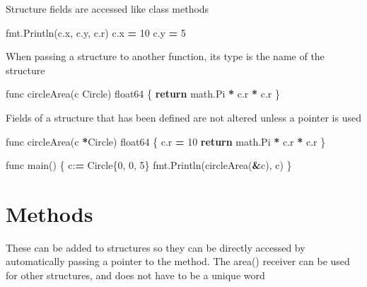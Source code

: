 \documentclass[]{book}
\newenvironment{Shaded}{\begin{snugshade}}{\end{snugshade}}
\newcommand{\ControlFlowTok}[1]{\textcolor[rgb]{0.13,0.29,0.53}{\textbf{#1}}}
\newcommand{\DecValTok}[1]{\textcolor[rgb]{0.00,0.00,0.81}{#1}}
\newcommand{\NormalTok}[1]{#1}
\newcommand{\OperatorTok}[1]{\textcolor[rgb]{0.81,0.36,0.00}{\textbf{#1}}}
\begin{document}
Structure fields are accessed like class methods

\begin{Shaded}
\begin{Highlighting}[]
\NormalTok{fmt.Println(c.x, c.y, c.r)}
\NormalTok{c.x }\OperatorTok{=} \DecValTok{10}
\NormalTok{c.y }\OperatorTok{=} \DecValTok{5}
\end{Highlighting}
\end{Shaded}

When passing a structure to another function, its type is the name of the structure

\begin{Shaded}
\begin{Highlighting}[]
\NormalTok{func circleArea(c Circle) float64 \{}
    \ControlFlowTok{return}\NormalTok{ math.Pi }\OperatorTok{*}\NormalTok{ c.r }\OperatorTok{*}\NormalTok{ c.r     }
\NormalTok{\}                                  }
\end{Highlighting}
\end{Shaded}

Fields of a structure that has been defined are not altered unless a pointer is used

\begin{Shaded}
\begin{Highlighting}[]
\NormalTok{func circleArea(c }\OperatorTok{*}\NormalTok{Circle) float64 \{}
\NormalTok{    c.r }\OperatorTok{=} \DecValTok{10}                        
    \ControlFlowTok{return}\NormalTok{ math.Pi }\OperatorTok{*}\NormalTok{ c.r }\OperatorTok{*}\NormalTok{ c.r      }
\NormalTok{\}                                   }
                                    
\NormalTok{func main() \{                       }
\NormalTok{    c:}\OperatorTok{=}\NormalTok{ Circle\{}\DecValTok{0}\NormalTok{, }\DecValTok{0}\NormalTok{, }\DecValTok{5}\NormalTok{\}             }
\NormalTok{    fmt.Println(circleArea(}\OperatorTok{&}\NormalTok{c), c)  }
\NormalTok{\}}
\end{Highlighting}
\end{Shaded}

\hypertarget{methods}{%
\section{Methods}\label{methods}}

These can be added to structures so they can be directly accessed by automatically passing a pointer to the method. The area() receiver can be used for other structures, and does not have to be a unique word
\end{document}
